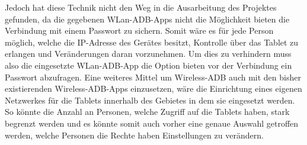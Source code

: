 \begin{flushleft}
Jedoch hat diese Technik nicht den Weg in die Ausarbeitung des Projektes gefunden, da die gegebenen WLan-ADB-Apps nicht die Möglichkeit bieten die Verbindung mit einem Passwort zu sichern. Somit wäre es für jede Person möglich, welche die IP-Adresse des Gerätes besitzt, Kontrolle über das Tablet zu erlangen und Veränderungen daran vorzunehmen. Um dies zu verhindern muss also die eingesetzte WLan-ADB-App die Option bieten vor der Verbindung ein Passwort abzufragen. Eine weiteres Mittel um Wireless-ADB auch mit den bisher existierenden Wireless-ADB-Apps einzusetzen, wäre die Einrichtung eines eigenen Netzwerkes für die Tablets innerhalb des Gebietes in dem sie eingesetzt werden. So könnte die Anzahl an Personen, welche Zugriff auf die Tablets haben, stark begrenzt werden und es könnte somit auch vorher eine genaue Auswahl getroffen werden, welche Personen die Rechte haben Einstellungen zu verändern.

\end{flushleft}
